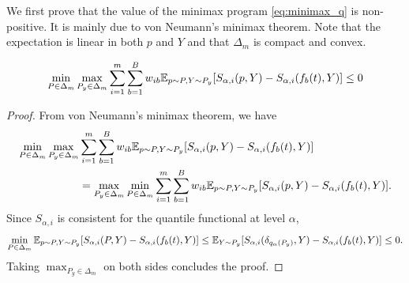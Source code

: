 We first prove that the value of the minimax program \eqref{eq:minimax_q} is non-positive. It is mainly due to von Neumann's minimax theorem. Note that the expectation is linear in both $p$ and $Y$ and that $\Delta_m$ is compact and convex.

\begin{lemma}\label{lem:minimax_single_q_neg}
  \[
  \min_{P \in \Delta_m} \max_{P_y \in \Delta_m} \sum_{i=1}^{m} \sum_{b=1}^B w_{ib}\mathbb{E}_{p\sim P, Y \sim P_y}[S_{\alpha,i}(p,Y) - S_{\alpha,i}(f_b(t),Y)] 
  \leq 0
  \]
  \end{lemma}
  \begin{proof}
  From von Neumann's minimax theorem, we have 
  \begin{align*}
  \min_{P \in \Delta_m} \max_{P_y \in \Delta_m} & \sum_{i=1}^{m} \sum_{b=1}^B w_{ib}\mathbb{E}_{p\sim P, Y \sim P_y}[S_{\alpha,i}(p,Y) - S_{\alpha,i}(f_b(t),Y)] \\
  & = \max_{P_y \in \Delta_m} \min_{P \in \Delta_m}  \sum_{i=1}^{m} \sum_{b=1}^B w_{ib}\mathbb{E}_{p\sim P, Y \sim P_y}[S_{\alpha,i}(p,Y) - S_{\alpha,i}(f_b(t),Y)].
  \end{align*}
  Since $S_{\alpha,i}$ is consistent for the quantile functional at level $\alpha$,
  \[
  \min_{P\in \Delta_m}\mathbb{E}_{p\sim P, Y \sim P_y}[S_{\alpha,i}(P,Y) - S_{\alpha,i}(f_b(t),Y)] 
  \leq 
  \mathbb{E}_{Y \sim P_y}[S_{\alpha,i}(\delta_{q_\alpha(P_y)},Y) - S_{\alpha,i}(f_b(t),Y)] 
  \leq 0.
  \]
  Taking $\max_{P_y \in \Delta_m}$ on both sides concludes the proof.
\end{proof}



